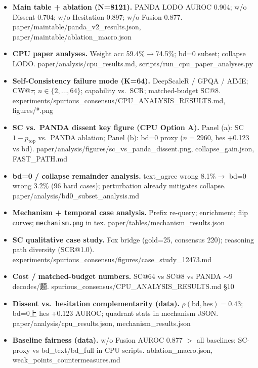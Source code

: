 \documentclass[11pt]{article}
\newcommand{\done}{\item[\textcolor{donecolor}{$\boxtimes$}]}
\newcommand{\datapath}[1]{\newline\textcolor{donecolor}{\small\ttfamily #1}}
\begin{document}
\begin{itemize}
  \done \textbf{Main table + ablation (N=8121).}
        PANDA LODO AUROC 0.904; w/o Dissent 0.704; w/o Hesitation 0.897; w/o Fusion 0.877.
        \datapath{paper/maintable/panda\_v2\_results.json, paper/maintable/ablation\_macro.json}

  \done \textbf{CPU paper analyses.}
        Weight acc 59.4\%$\rightarrow$74.5\%; bd=0 subset; collapse LODO.
        \datapath{paper/analysis/cpu\_results.md, scripts/run\_cpu\_paper\_analyses.py}

  \done \textbf{Self-Consistency failure mode (K=64).}
        DeepScaleR / GPQA / AIME; CW@$\tau$; $n\in\{2,\ldots,64\}$; capability vs.\ SCR; matched-budget SC@8.
        \datapath{experiments/spurious\_consensus/CPU\_ANALYSIS\_RESULTS.md, figures/*.png}

  \done \textbf{SC vs.\ PANDA dissent key figure (CPU Option A).}
        Panel (a): SC $1{-}p_{\mathrm{top}}$ vs.\ PANDA ablation; Panel (b): bd=0 proxy ($n{=}2960$, hes +0.123 vs bd).
        \datapath{paper/analysis/figures/sc\_vs\_panda\_dissent.png, collapse\_gain.json, FAST\_PATH.md}

  \done \textbf{bd=0 / collapse remainder analysis.}
        text\_agree wrong 8.1\%$\rightarrow$ bd=0 wrong 3.2\% (96 hard cases); perturbation already mitigates collapse.
        \datapath{paper/analysis/bd0\_subset\_analysis.md}

  \done \textbf{Mechanism + temporal case analysis.}
        Prefix re-query; enrichment; flip curves; \texttt{mechanism.png} in tex.
        \datapath{paper/tables/mechanism\_results.json}

  \done \textbf{SC qualitative case study.}
        Fox bridge (gold=25, consensus 220); reasoning path diversity (SCR@1.0).
        \datapath{experiments/spurious\_consensus/figures/case\_study\_12473.md}

  \done \textbf{Cost / matched-budget numbers.}
        SC@64 vs SC@8 vs PANDA ${\sim}9$ decodes/题.
        \datapath{spurious\_consensus/CPU\_ANALYSIS\_RESULTS.md \S10}

  \done \textbf{Dissent vs.\ hesitation complementarity (data).}
        $\rho(\mathrm{bd},\mathrm{hes}){=}0.43$; bd=0上 hes +0.123 AUROC; quadrant stats in mechanism JSON.
        \datapath{paper/analysis/cpu\_results.json, mechanism\_results.json}

  \done \textbf{Baseline fairness (data).}
        w/o Fusion AUROC 0.877 $>$ all baselines; SC-proxy vs bd\_text/bd\_full in CPU scripts.
        \datapath{ablation\_macro.json, weak\_points\_countermeasures.md}


\end{itemize}
\end{document}
